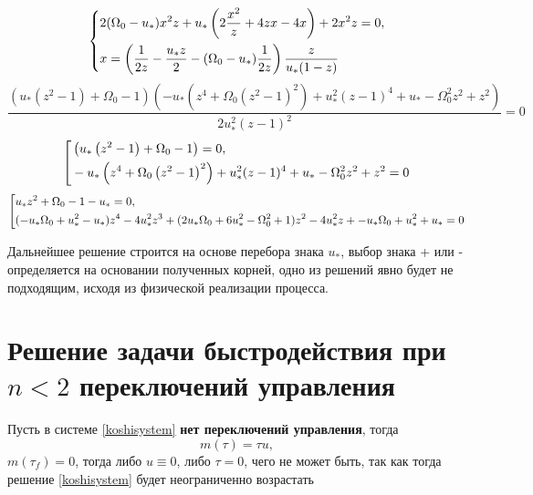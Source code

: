 \documentclass[a4paper,12pt, openany]{book}
\theoremstyle{plain} %
\theoremstyle{definition} %
\theoremstyle{remark} %
\numberwithin{equation}{chapter}
\begin{document}
{\begin{equation}
    \left\{ {\begin{aligned}
                 & 2(\Omega_0-u_*)x^2z+u_*\left(2\frac{x^2}{z}+4zx-4x\right)+2x^2z=0, \hfill                       \\
                 & x=\left( \frac{1}{2z}-\frac{u_*z}{2}-(\Omega_0-u_*)\frac{1}{2z}\right)\frac{z}{u_*(1-z)} \hfill \\
            \end{aligned}} \right.
\end{equation}
\[
    \frac{\left(u_* \left(z^2-1\right)+\Omega _0-1\right) \left(-u_* \left(z^4+\Omega _0 \left(z^2-1\right)^2\right)+u_*^2 (z-1)^4+u_*-\Omega _0^2 z^2+z^2\right)}{2 u_*^2 (z-1)^2}=0
\]
\begin{equation}
    \left[ {\begin{aligned}
                 & \left(u_* \left(z^2-1\right)+\Omega _0-1\right)=0, \hfill                                           \\
                 & -u_* \left(z^4+\Omega _0 \left(z^2-1\right)^2\right)+u_*^2 (z-1)^4+u_*-\Omega _0^2 z^2+z^2=0 \hfill \\
            \end{aligned}} \right.
\end{equation}
\begin{equation}\label{final_polynom}
    \left[ {\begin{aligned}
                 & u_*z^2+\Omega _0-1-u_*=0, \hfill                                                                                               \\
                 & (-u_* \Omega _0+u_*^2-u_*)z^4-4 u_*^2z^3+(2 u_* \Omega _0+6 u_*^2-\Omega _0^2+1)z^2-4 u_*^2z+-u_* \Omega _0+u_*^2+u_*=0 \hfill \\
            \end{aligned}} \right.
\end{equation}

Дальнейшее решение строится на основе перебора знака $u_\ast$, выбор знака + или - определяется на основании полученных корней,
одно из решений явно будет не подходящим, исходя из физической реализации процесса.
\section{Решение задачи быстродействия при $n<2$ переключений управления}
Пусть в системе \eqref{koshisystem} \textbf{нет переключений управления}, тогда 
\[
    m(\tau) = \tau u, 
\]
$m(\tau_f)=0$, тогда либо $u\equiv0$, либо $\tau=0$, чего не может быть, так как тогда решение \eqref{koshisystem} будет неограниченно возрастать

}
\end{document}
